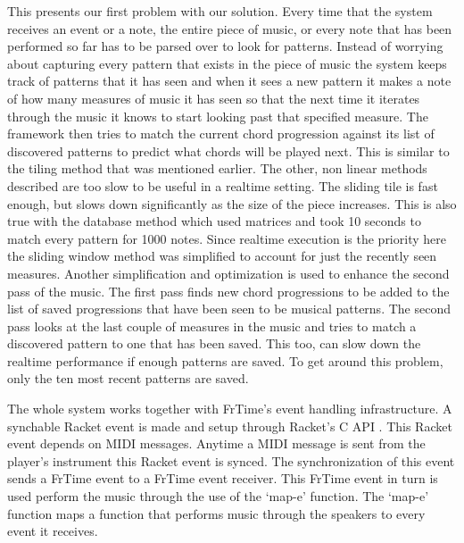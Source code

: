 \documentclass[12pt]{ucthesis}
\begin{document}
This presents our first problem with our solution. Every time that the system receives an event or a note, the entire piece of music, or every note that has been performed so far has to be parsed over to look for patterns. Instead of worrying about capturing every pattern that exists in the piece of music the system keeps track of patterns that it has seen and when it sees a new pattern it makes a note of how many measures of music it has seen so that the next time it iterates through the music it knows to start looking past that specified measure. The framework then tries to match the current chord progression against its list of discovered patterns to predict what chords will be played next. This is similar to the tiling method that was mentioned earlier. The other, non linear methods described are too slow to be useful in a realtime setting. The sliding tile is fast enough, but slows down significantly as the size of the piece increases. This is also true with the database method which used matrices and took 10 seconds to match every pattern for 1000 notes. Since realtime execution is the priority here the sliding window method was simplified to account for just the recently seen measures. Another simplification and optimization is used to enhance the second pass of the music. The first pass finds new chord progressions to be added to the list of saved progressions that have been seen to be musical patterns. The second pass looks at the last couple of measures in the music and tries to match a discovered pattern to one that has been saved. This too, can slow down the realtime performance if enough patterns are saved. To get around this problem, only the ten most recent patterns are saved. 

The whole system works together with FrTime's event handling infrastructure. A synchable Racket event is made and setup through Racket's C API . This Racket event depends on MIDI messages. Anytime a MIDI message is sent from the player's instrument this Racket event is synced. The synchronization of this event sends a FrTime event to a FrTime event receiver. This FrTime event in turn is used perform the music through the use of the `map-e' function. The `map-e' function maps a function that performs music through the speakers to every event it receives. 

\end{document}
